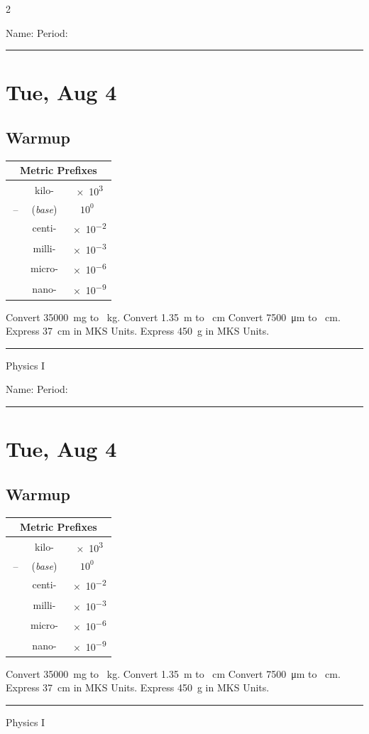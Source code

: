\documentclass[10pt,landscape]{exam}
\def\todayDate{Tue, Aug 4}
\def\content{

    \begin{tabular}{ccc}
      \hline
      \multicolumn{3}{c}{Metric Prefixes}                 \\
      \hline
      \SI{}{\kilo\relax}  & kilo-            & \SI{e3}{}  \\
             --           & (\textit{base})  & $10^0$     \\
      \SI{}{\centi\relax} & centi-           & \SI{e-2}{} \\
      \SI{}{\milli\relax} & milli-           & \SI{e-3}{} \\
      \SI{}{\micro\relax} & micro-           & \SI{e-6}{} \\
      \SI{}{\nano\relax}  & nano-            & \SI{e-9}{} \\
      \hline
    \end{tabular}
    
  \begin{questions}
    \question 
      Convert \SI{35000}{\milli\gram} to \SI{}{\kilo\gram}.
      \vs
    \question 
      Convert \SI{1.35}{\meter} to \SI{}{\centi\meter}
      \vs
    \question 
      Convert \SI{7500}{\micro\meter} to \SI{}{\centi\meter}.
      \vs
    \question 
      Express \SI{37}{\centi\meter} in MKS Units.
      \vs
    \question
      Express \SI{450}{\gram} in MKS Units.
      \vspace*{2em}
    
  \end{questions}



}
\begin{document}
\pagestyle{empty}

\setlength{\columnsep}{0.8in}
\begin{multicols*}{2}

\noindent  
Name: \hfill Period: \hspace{5em}
\vspace{0.5em}
\hrule

\section*{\todayDate}
\subsection*{Warmup}

\content

\vfill
\hrule
\vspace{0.5em}
\hfill {\sc Physics I}

\columnbreak

\noindent  
Name: \hfill Period: \hspace{5em}
\vspace{0.5em}
\hrule

\section*{\todayDate}
\subsection*{Warmup}

\content

\vfill
\hrule
\vspace{0.5em}
\hfill {\sc Physics I}

\end{multicols*}
\end{document}
